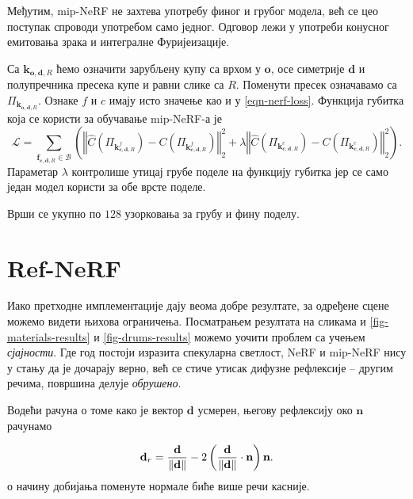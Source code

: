 \documentclass[12pt, a4paper, twoside]{book}
\numberwithin{equation}{chapter}
\numberwithin{theorem}{section}
\numberwithin{definition}{section}
\numberwithin{definitionChapter}{chapter}
\begin{document}
Међутим, mip-NeRF не захтева употребу финог и грубог модела, већ се цео поступак спроводи употребом само једног.
Одговор лежи у употреби конусног емитовања зрака и интегралне Фуријеизације.

Са $\mathbf{k}_{\mathbf{o}, \mathbf{d}, R}$ ћемо означити зарубљену купу са врхом у $\mathbf{o}$, осе
симетрије $\mathbf{d}$ и полупречника пресека купе и равни слике са $R$. Поменути пресек означавамо са
$\Pi_{\mathbf{k}_{\mathbf{o}, \mathbf{d}, R}}$. Ознаке $f$ и $c$ имају исто значење као и у \ref{eqn-nerf-loss}.
Функција губитка која се користи за обучавање mip-NeRF-а је
\begin{equation}
	\mathcal{L} = \sum_{\mathbf{f}_{\mathbf{c}, \mathbf{d}, R} \in \mathcal{B}}
	\left(
	\left\Vert \hat{C}\left(\Pi_{\mathbf{k}^{f}_{\mathbf{c}, \mathbf{d}, R}}\right) -
		C\left(\Pi_{\mathbf{k}^{f}_{\mathbf{c}, \mathbf{d}, R}}\right) \right\Vert^2_2 +
	\lambda
	\left\Vert \hat{C}\left(\Pi_{\mathbf{k}^{c}_{\mathbf{c}, \mathbf{d}, R}}\right) -
		C\left(\Pi_{\mathbf{k}^{c}_{\mathbf{c}, \mathbf{d}, R}}\right) \right\Vert^2_2
	\right).
\end{equation}
Параметар $\lambda$ контролише утицај грубе поделе на функцију губитка јер се само један модел користи за обе врсте поделе.

Врши се укупно по $128$ узорковања за грубу и фину поделу.

\section{Ref-NeRF}
Иако претходне имплементације дају веома добре резултате, за одређене сцене можемо видети њихова ограничења.
Посматрањем резултата на сликама и \ref{fig-materials-results} и \ref{fig-drums-results} можемо уочити проблем
са учењем \textit{сјајности}. Где год постоји изразита спекуларна светлост, NeRF и mip-NeRF нису у стању да је
дочарају верно, већ се стиче утисак дифузне рефлексије -- другим речима, површина делује \textit{обрушено}.

Водећи рачуна о томе како је вектор $\textbf{d}$ усмерен, његову рефлексију око $\textbf{n}$ рачунамо

	\begin{equation}
		\textbf{d}_r = \frac{\textbf{d}}{\left\Vert\mathbf{d}\right\Vert}
		-2\left(\frac{\textbf{d}}{\left\Vert\mathbf{d}\right\Vert} \cdot
			\boldsymbol{\textbf{n}}\right)\textbf{\text{n}}
		\label{eqn-reflection}.
	\end{equation}
о начину добијања поменуте нормале биће више речи касније.
\end{document}
